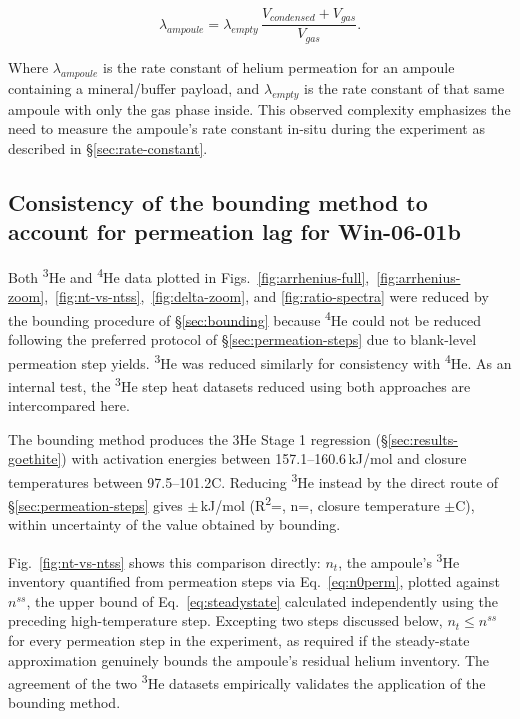 \begin{equation}
\label{eq:keff}
\lambda_{ampoule} = \lambda_{empty}\,\frac{V_{condensed} + V_{gas}}{V_{gas}} .
\end{equation}

Where $\lambda_{ampoule}$ is the rate constant of helium permeation for an ampoule containing a mineral/buffer payload, and $\lambda_{empty}$ is the rate constant of that same ampoule with only the gas phase inside. This observed complexity emphasizes the need to measure the ampoule's rate constant in-situ during the experiment as described in \S\ref{sec:rate-constant}. 

\subsection{Consistency of the bounding method to account for permeation lag for Win-06-01b}\label{sec:discussion-bounding-direct}

Both \textsuperscript{3}He and \textsuperscript{4}He data plotted in Figs.~\ref{fig:arrhenius-full},~\ref{fig:arrhenius-zoom},~\ref{fig:nt-vs-ntss},~\ref{fig:delta-zoom}, and \ref{fig:ratio-spectra} were reduced by the bounding procedure of \S\ref{sec:bounding} because \textsuperscript{4}He could not be reduced following the preferred protocol of \S\ref{sec:permeation-steps} due to blank-level permeation step yields. \textsuperscript{3}He was reduced similarly for consistency with \textsuperscript{4}He. As an internal test, the \textsuperscript{3}He step heat datasets reduced using both approaches are intercompared here.

The bounding method produces the 3He Stage 1 regression (\S\ref{sec:results-goethite}) with activation energies between 157.1--160.6\,kJ/mol and closure temperatures between 97.5--101.2\textdegree C.
Reducing \textsuperscript{3}He instead by the direct route of \S\ref{sec:permeation-steps} gives \ChTwoBracketEa$\pm$\ChTwoBracketEaErr\,kJ/mol (R\textsuperscript{2}=\ChTwoBracketRtwo, n=\ChTwoBracketN, closure temperature \ChTwoBracketTc$\pm$\ChTwoBracketTcErr\textdegree C), within uncertainty of the value obtained by bounding. 

Fig.~\ref{fig:nt-vs-ntss} shows this comparison directly: $n_t$, the ampoule's \textsuperscript{3}He inventory quantified from permeation steps via Eq.~\eqref{eq:n0perm}, plotted against $n^{ss}$, the upper bound of Eq.~\eqref{eq:steadystate} calculated independently using the preceding high-temperature step. Excepting two steps discussed below, $n_t \leq n^{ss}$ for every permeation step in the experiment, as required if the steady-state approximation genuinely bounds the ampoule's residual helium inventory. The agreement of the two \textsuperscript{3}He datasets empirically validates the application of the bounding method. 

